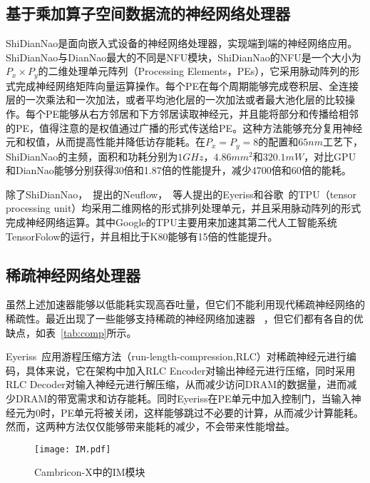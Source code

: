 \subsection{基于乘加算子空间数据流的神经网络处理器}
ShiDianNao是面向嵌入式设备的神经网络处理器，实现端到端的神经网络应用。ShiDianNao与DianNao最大的不同是NFU模块，ShiDianNao的NFU是一个大小为$P_x\times P_y$的二维处理单元阵列（Processing Elements，PEs），它采用脉动阵列的形式完成神经网络矩阵向量运算操作。每个PE在每个周期能够完成卷积层、全连接层的一次乘法和一次加法，或者平均池化层的一次加法或者最大池化层的比较操作。每个PE能够从右方邻居和下方邻居读取神经元，并且能将部分和传播给相邻的PE，值得注意的是权值通过广播的形式传送给PE。这种方法能够充分复用神经元和权值，从而提高性能并降低访存能耗。在$P_x=P_y=8$的配置和$65nm$工艺下，ShiDianNao的主频，面积和功耗分别为$1GHz$，$4.86mm^2$和$320.1mW$，对比GPU和DianNao能够分别获得30倍和1.87倍的性能提升，减少4700倍和60倍的能耗。

除了ShiDianNao，~\citet{farabet2011neuflow}提出的Neuflow，~\citet{chen2016eyeriss}等人提出的Eyeriss和谷歌~\cite{jouppi2017tpu}的TPU（tensor processing unit）均采用二维网格的形式排列处理单元，并且采用脉动阵列的形式完成神经网络运算。其中Google的TPU主要用来加速其第二代人工智能系统TensorFolow的运行，并且相比于K80能够有15倍的性能提升。

\subsection{稀疏神经网络处理器}
虽然上述加速器能够以低能耗实现高吞吐量，但它们不能利用现代稀疏神经网络的稀疏性。最近出现了一些能够支持稀疏的神经网络加速器~\cite{chen2017eyeriss,zhang2016cambricon,albericio2016cnvlutin,han2016eie,han2017ese,angshuman2017scnn}
，但它们都有各自的优缺点，如表~\ref{tab:comp}所示。

Eyeriss~\cite{chen2017eyeriss}应用游程压缩方法（run-length-compression,RLC）对稀疏神经元进行编码，具体来说，它在架构中加入RLC Encoder对输出神经元进行压缩，同时采用RLC Decoder对输入神经元进行解压缩，从而减少访问DRAM的数据量，进而减少DRAM的带宽需求和访存能耗。同时Eyeriss在PE单元中加入控制门，当输入神经元为0时，PE单元将被关闭，这样能够跳过不必要的计算，从而减少计算能耗。然而，这两种方法仅仅能够带来能耗的减少，不会带来性能增益。

\begin{figure}[h]
  \centering
  \texttt{[image: IM.pdf]}
  \caption{\footnotesize Cambricon-X中的IM模块}
  \label{fig:IM}
\end{figure}

